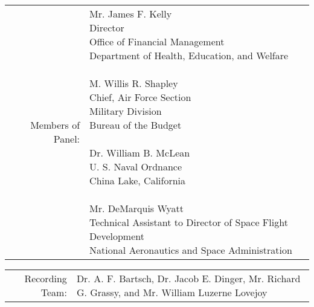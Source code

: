 \documentclass{memoir}
\begin{document}
\begin{tabular}{rp{8cm}}
Members of Panel: & \parbox[t]{8cm}{
                    Mr. James F. Kelly                                           \\
                    Director                                                     \\
                    Office of Financial Management                               \\
                    Department of Health, Education, and Welfare                 \\
                    \\
                    M. Willis R. Shapley                                         \\
                    Chief, Air Force Section                                     \\
                    Military Division                                            \\
                    Bureau of the Budget                                         \\
                    \\
                    Dr. William B. McLean                                        \\
                    U. S. Naval Ordnance                                         \\
                    China Lake, California                                       \\
                    \\
                    Mr. DeMarquis Wyatt                                          \\
                    Technical Assistant to Director of Space Flight Development  \\
                    National Aeronautics and Space Administration}
\end{tabular}

\vspace{5mm}

\begin{tabular}{rp{8cm}}
Recording Team: & Dr. A. F. Bartsch, Dr. Jacob E. Dinger, Mr. Richard G. Grassy, and Mr. William Luzerne Lovejoy
\end{tabular}

\vspace{1cm}
\end{document}
